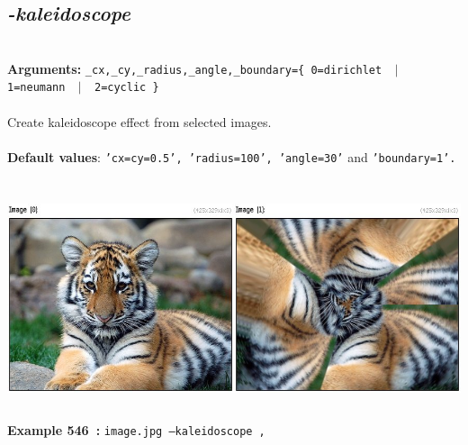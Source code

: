 \documentclass[a4paper,11pt,twoside]{book}
\begin{document}
\subsection{\emph{-kaleidoscope} }\vspace*{-0.5em}
~\\\textbf{Arguments: } 
{\small \texttt{\_cx,\_cy,\_radius,\_angle,\_boundary=\{ 0=dirichlet ~$|$~ 1=neumann ~$|$~ 2=cyclic \}}}\\~\\
Create kaleidoscope effect from selected images.
~\\~\\\textbf{Default values}: {\small \texttt{'cx=cy=0.5', 'radius=100', 'angle=30'} and \texttt{'boundary=1'.}}
\begin{center}\includegraphics[keepaspectratio=true,height=7cm,width=\textwidth]{img/gmic_def546.jpg}\\
{\footnotesize \textbf{Example 546~:} \texttt{image.jpg --kaleidoscope ,}}
\end{center}
\end{document}
